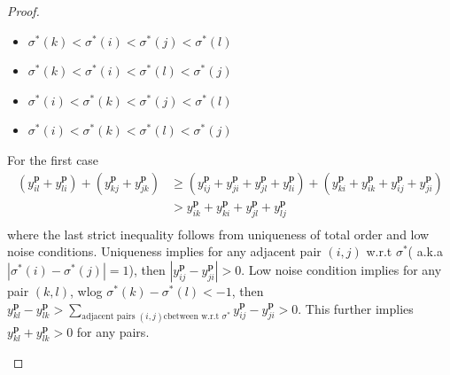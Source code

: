 \begin{proof}
\begin{itemize}
	\begin{itemize}
		\item $\sigma^*(k)<\sigma^*(i)<\sigma^*(j)<\sigma^*(l)$
			\item $\sigma^*(k)<\sigma^*(i)<\sigma^*(l)<\sigma^*(j)$
				\item $\sigma^*(i)<\sigma^*(k)<\sigma^*(j)<\sigma^*(l)$
					\item $\sigma^*(i)<\sigma^*(k)<\sigma^*(l)<\sigma^*(j)$
	\end{itemize}
For the first case
\begin{equation*}
\begin{split}
(y_{il}^\mathbf{p}+y_{li}^\mathbf{p})+(y_{kj}^\mathbf{p}+y_{jk}^\mathbf{p})&\geq (y_{ij}^\mathbf{p}+y_{ji}^\mathbf{p}+y_{jl}^\mathbf{p}+y_{li}^\mathbf{p}) + (y_{ki}^\mathbf{p}+y_{ik}^\mathbf{p}+y_{ij}^\mathbf{p}+y_{ji}^\mathbf{p})\\
&>y_{ik}^\mathbf{p}+y_{ki}^\mathbf{p}+y_{jl}^\mathbf{p}+y_{lj}^\mathbf{p}\\
\end{split}
\end{equation*}
where the last strict inequality follows from uniqueness of total order and low noise conditions. Uniqueness implies for any adjacent pair $(i,j)$ w.r.t $\sigma^*$( a.k.a  $|\sigma^*(i)-\sigma^*(j)|=1$), then $|y_{ij}^\mathbf{p}-y_{ji}^\mathbf{p}|>0$. Low noise condition implies for any pair $(k,l)$, wlog $\sigma^*(k)-\sigma^*(l)<-1$, then $y_{kl}^\mathbf{p}-y_{lk}^\mathbf{p}>\sum\limits_{\text{adjacent pairs }(i,j) \text{cbetween w.r.t }\sigma^* }y_{ij}^\mathbf{p}-y_{ji}^\mathbf{p}>0$. This further implies $y_{kl}^\mathbf{p}+y_{lk}^\mathbf{p}>0$ for any pairs. 


\end{itemize}
\end{proof}
